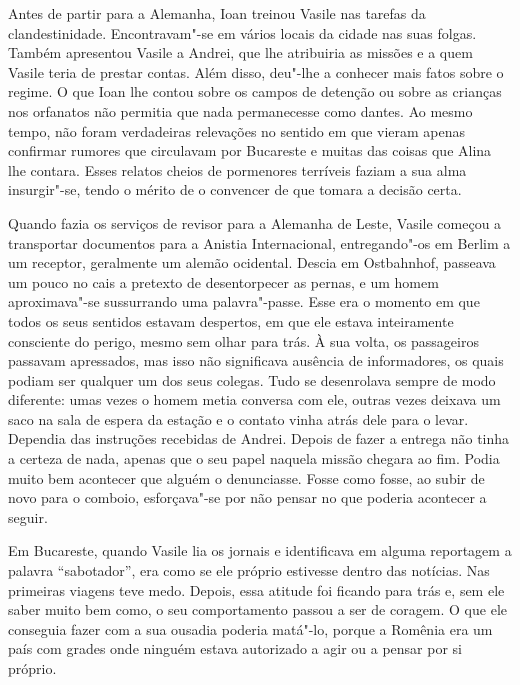 Antes de partir para a Alemanha, Ioan treinou Vasile nas tarefas da
clandestinidade. Encontravam"-se em vários locais da cidade nas suas
folgas. Também apresentou Vasile a Andrei, que lhe atribuiria as missões
e a quem Vasile teria de prestar contas. Além disso, deu"-lhe a conhecer
mais fatos sobre o regime. O que Ioan lhe contou sobre os campos de
detenção ou sobre as crianças nos orfanatos não permitia que nada
permanecesse como dantes. Ao mesmo tempo, não foram verdadeiras
relevações no sentido em que vieram apenas confirmar rumores que
circulavam por Bucareste e muitas das coisas que Alina lhe contara.
Esses relatos cheios de pormenores terríveis faziam a sua alma
insurgir"-se, tendo o mérito de o convencer de que tomara a decisão
certa.

Quando fazia os serviços de revisor para a Alemanha
de Leste, Vasile começou a transportar documentos para a Anistia
Internacional, entregando"-os em Berlim a um receptor, geralmente um
alemão ocidental. Descia em Ostbahnhof, passeava um pouco no cais a
pretexto de desentorpecer as pernas, e um homem aproximava"-se
sussurrando uma palavra"-passe. Esse era o momento em
que todos os seus sentidos estavam despertos, em que ele estava
inteiramente consciente do perigo, mesmo sem olhar para trás. À sua
volta, os passageiros passavam apressados, mas isso não significava
ausência de informadores, os quais podiam ser qualquer um dos seus
colegas. Tudo se desenrolava sempre de modo diferente: umas vezes o
homem metia conversa com ele, outras vezes deixava um saco na sala de
espera da estação e o contato vinha atrás dele para o levar. Dependia
das instruções recebidas de Andrei. Depois de fazer a entrega não tinha
a certeza de nada, apenas que o seu papel naquela missão chegara ao fim.
Podia muito bem acontecer que alguém o denunciasse. Fosse como fosse, ao
subir de novo para o comboio, esforçava"-se por não pensar no que poderia
acontecer a seguir.

Em Bucareste, quando Vasile lia os jornais e identificava em alguma reportagem a palavra ``sabotador'', era como se ele próprio
estivesse dentro das notícias. Nas primeiras viagens teve medo. Depois,
essa atitude foi ficando para trás e, sem ele saber muito bem como, o
seu comportamento passou a ser de coragem. O que ele conseguia fazer
com a sua ousadia poderia matá"-lo, porque a Romênia era um país com
grades onde ninguém estava autorizado a agir ou a pensar por si próprio.

